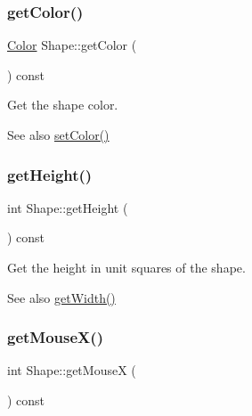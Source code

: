 \subsubsection{\texorpdfstring{get\+Color()}{getColor()}}
{\footnotesize\ttfamily \mbox{\hyperlink{class_color}{Color}} Shape\+::get\+Color (\begin{DoxyParamCaption}{ }\end{DoxyParamCaption}) const\hspace{0.3cm}{\ttfamily [inline]}}



Get the shape color. 

\begin{DoxySeeAlso}{See also}
\mbox{\hyperlink{class_shape_a657c70819a01a52d56c68302f07ffad9}{set\+Color()}} 
\end{DoxySeeAlso}
\mbox{\label{class_shape_ad81db3946b35eaeb9dcfbaaacb65c5f8}} 
\subsubsection{\texorpdfstring{get\+Height()}{getHeight()}}
{\footnotesize\ttfamily int Shape\+::get\+Height (\begin{DoxyParamCaption}{ }\end{DoxyParamCaption}) const\hspace{0.3cm}{\ttfamily [inline]}}



Get the height in unit squares of the shape. 

\begin{DoxySeeAlso}{See also}
\mbox{\hyperlink{class_shape_a26c64aa551ac8d6d625ee74237157045}{get\+Width()}} 
\end{DoxySeeAlso}
\mbox{\label{class_shape_aef8956ea2a795d59df6fad328b0b85b8}} 
\subsubsection{\texorpdfstring{get\+Mouse\+X()}{getMouseX()}}
{\footnotesize\ttfamily int Shape\+::get\+MouseX (\begin{DoxyParamCaption}{ }\end{DoxyParamCaption}) const\hspace{0.3cm}{\ttfamily [inline]}}




